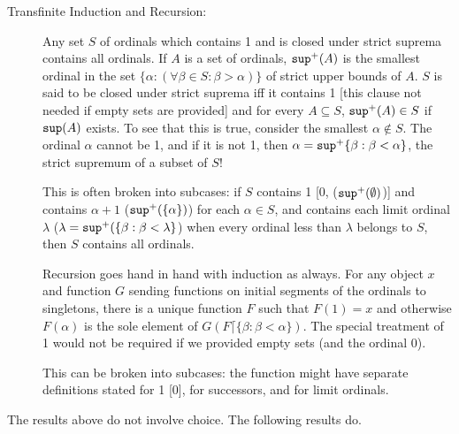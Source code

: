\documentclass[12pt]{article}
\begin{document}
\begin{description}
\item[Transfinite Induction and Recursion:]  Any set $S$ of ordinals which contains 1 and is closed under strict suprema contains all ordinals.  If $A$ is a set of ordinals, ${\tt sup}^+(A)$ is the smallest ordinal in the set $\{\alpha:(\forall \beta \in S:\beta > \alpha)\}$ of strict upper bounds of $A$.   $S$ is said to be closed under strict suprema iff it contains 1 [this clause not needed if empty sets are provided] and  for every $A \subseteq S$, ${\tt sup}^+(A) \in S$ if ${\tt sup}(A)$ exists.  To see that this is true, consider the smallest $\alpha \not\in S$.  The ordinal $\alpha$ cannot be 1, and if it is not 1, then $\alpha = {\tt sup}^+\{\beta:\beta <\alpha\}$, the strict supremum of a subset of $S$!

This is often broken into subcases:  if $S$ contains 1 [0, (${\tt sup}^+(\emptyset)$)] and contains $\alpha+1$ (${\tt sup}^+(\{\alpha\})$) for each $\alpha\in S$, and contains each limit ordinal $\lambda$ ($\lambda = {\tt sup}^+(\{\beta:\beta<\lambda\}$) when every ordinal less than $\lambda$ belongs to $S$, then $S$ contains all ordinals.

Recursion goes hand in hand with induction as always.  For any object $x$ and function $G$ sending functions on initial segments of the ordinals to singletons, there is a unique function $F$ such that $F(1)=x$ and otherwise $F(\alpha)$ is the sole element of $G(F \lceil \{\beta:\beta<\alpha\})$.  The special treatment of 1 would not be required if we provided empty sets (and the ordinal 0).

This can be broken into subcases:  the function might have separate definitions stated for 1 [0], for successors, and for limit ordinals.

\end{description}

The results above do not involve choice.  The following results do.
\end{document}
